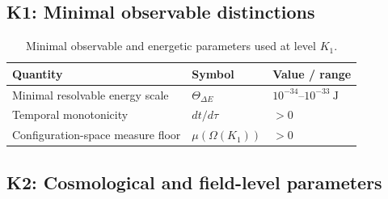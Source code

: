 
\subsection*{K1: Minimal observable distinctions}

\begin{table}[htbp]
  \centering
  \caption{Minimal observable and energetic parameters used at level \(K_1\).}
  \label{tab:k1-minimal-observable-parameters}
  \begin{tabular}{@{}L{0.42\textwidth}L{0.18\textwidth}L{0.25\textwidth}@{}}
    \hline
    Quantity & Symbol & Value / range \\
    \hline
    Minimal resolvable energy scale & \(\Theta_{\Delta E}\)
        & \(10^{-34}\text{--}10^{-33}~\mathrm{J}\) \\
    Temporal monotonicity & \(dt/d\tau\)
        & \(> 0\) \\
    Configuration-space measure floor & \(\mu(\Omega(K_1))\)
        & \(> 0\) \\
    \hline
\end{tabular}
\end{table}



\subsection*{K2: Cosmological and field-level parameters}

